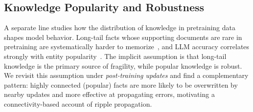 \subsection{Knowledge Popularity and Robustness}

A separate line studies how the distribution of knowledge in
pretraining data shapes model behavior. Long-tail facts whose
supporting documents are rare in pretraining are systematically harder
to memorize~\cite{kandpal2023longtail}, and LLM accuracy correlates
strongly with entity popularity~\cite{mallen2023not}. The implicit
assumption is that long-tail knowledge is the primary source of
fragility, while popular knowledge is robust. We revisit this
assumption under \emph{post-training updates} and find a complementary
pattern: highly connected (popular) facts are more likely to be
overwritten by nearby updates and more effective at propagating
errors, motivating a connectivity-based account of ripple propagation.








